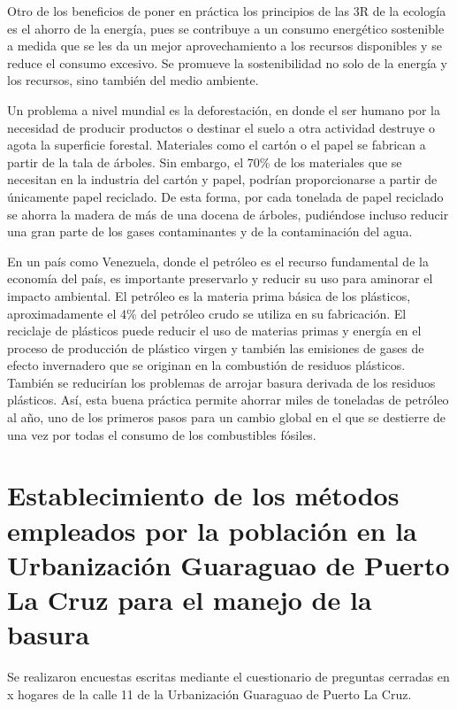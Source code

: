 Otro de los beneficios de poner en práctica los principios de las 3R de la ecología es el ahorro de la energía, pues se contribuye a un consumo energético sostenible a medida que se les da un mejor aprovechamiento a los recursos disponibles y se reduce el consumo excesivo. Se promueve la sostenibilidad no solo de la energía y los recursos, sino también del medio ambiente.

Un problema a nivel mundial es la deforestación, en donde el ser humano por la necesidad de producir productos o destinar el suelo a otra actividad destruye o agota la superficie forestal. Materiales como el cartón o el papel se fabrican a partir de la tala de árboles. Sin embargo, el 70\% de los materiales que se necesitan en la industria del cartón y papel, podrían proporcionarse a partir de únicamente papel reciclado. De esta forma, por cada tonelada de papel reciclado se ahorra la madera de más de una docena de árboles, pudiéndose incluso reducir una gran parte de los gases contaminantes y de la contaminación del agua. 

En un país como Venezuela, donde el petróleo es el recurso fundamental de la economía del país, es importante preservarlo y reducir su uso para aminorar el impacto ambiental. El petróleo es la materia prima básica de los plásticos, aproximadamente el 4\% del petróleo crudo se utiliza en su fabricación. El reciclaje de plásticos puede reducir el uso de materias primas y energía en el proceso de producción de plástico virgen y también las emisiones de gases de efecto invernadero que se originan en la combustión de residuos plásticos. También se reducirían los problemas de arrojar basura derivada de los residuos plásticos. Así, esta buena práctica permite ahorrar miles de toneladas de petróleo al año, uno de los primeros pasos para un cambio global en el que se destierre de una vez por todas el consumo de los combustibles fósiles.

\newpage

\section{Establecimiento de los métodos empleados por la población en la \\[6pt] Urbanización Guaraguao de Puerto La Cruz para el manejo de la basura}

Se realizaron encuestas escritas mediante el cuestionario de preguntas cerradas en x hogares de la calle 11 de la Urbanización Guaraguao de Puerto La Cruz.

